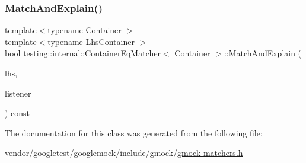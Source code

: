 \mbox{\label{classtesting_1_1internal_1_1_container_eq_matcher_a348c6139776dd7d713d100e406ee38f4}} 
\subsubsection{\texorpdfstring{Match\+And\+Explain()}{MatchAndExplain()}}
{\footnotesize\ttfamily template$<$typename Container $>$ \\
template$<$typename Lhs\+Container $>$ \\
bool \hyperlink{classtesting_1_1internal_1_1_container_eq_matcher}{testing\+::internal\+::\+Container\+Eq\+Matcher}$<$ Container $>$\+::Match\+And\+Explain (\begin{DoxyParamCaption}\item[{const Lhs\+Container \&}]{lhs,  }\item[{\hyperlink{classtesting_1_1_match_result_listener}{Match\+Result\+Listener} $\ast$}]{listener }\end{DoxyParamCaption}) const\hspace{0.3cm}{\ttfamily [inline]}}



The documentation for this class was generated from the following file\+:\begin{DoxyCompactItemize}
\item 
vendor/googletest/googlemock/include/gmock/\hyperlink{gmock-matchers_8h}{gmock-\/matchers.\+h}\end{DoxyCompactItemize}
